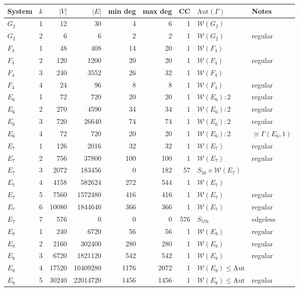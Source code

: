 \documentclass[11pt]{article}
\newcommand{\W}{\mathcal{W}}
\begin{document}
\begin{table}[h]
\centering
\begin{tabular}{llrrrrrll}
\toprule
System & $k$ & $|V|$ & $|E|$ & min deg & max deg & CC & $\mathrm{Aut}(\Gamma)$ & Notes \\
\midrule
$G_2$ & 1 & 12 & 30 & 4 & 6 & 1 & $\W(G_2)$ & \\
$G_2$ & 2 & 6 & 6 & 2 & 2 & 1 & $\W(G_2)$ & regular \\
\midrule
$F_4$ & 1 & 48 & 408 & 14 & 20 & 1 & $\W(F_4)$ & \\
$F_4$ & 2 & 120 & 1200 & 20 & 20 & 1 & $\W(F_4)$ & regular \\
$F_4$ & 3 & 240 & 3552 & 26 & 32 & 1 & $\W(F_4)$ & \\
$F_4$ & 4 & 24 & 96 & 8 & 8 & 1 & $\W(F_4)$ & regular \\
\midrule
$E_6$ & 1 & 72 & 720 & 20 & 20 & 1 & $\W(E_6){:}2$ & regular \\
$E_6$ & 2 & 270 & 4590 & 34 & 34 & 1 & $\W(E_6){:}2$ & regular \\
$E_6$ & 3 & 720 & 26640 & 74 & 74 & 1 & $\W(E_6){:}2$ & regular \\
$E_6$ & 4 & 72 & 720 & 20 & 20 & 1 & $\W(E_6){:}2$ & $\cong \Gamma(E_6, 1)$ \\
\midrule
$E_7$ & 1 & 126 & 2016 & 32 & 32 & 1 & $\W(E_7)$ & regular \\
$E_7$ & 2 & 756 & 37800 & 100 & 100 & 1 & $\W(E_7)$ & regular \\
$E_7$ & 3 & 2072 & 183456 & 0 & 182 & 57 & $S_{56} \times \W(E_7)$ & \\
$E_7$ & 4 & 4158 & 582624 & 272 & 544 & 1 & $\W(E_7)$ & \\
$E_7$ & 5 & 7560 & 1572480 & 416 & 416 & 1 & $\W(E_7)$ & regular \\
$E_7$ & 6 & 10080 & 1844640 & 366 & 366 & 1 & $\W(E_7)$ & regular \\
$E_7$ & 7 & 576 & 0 & 0 & 0 & 576 & $S_{576}$ & edgeless \\
\midrule
$E_8$ & 1 & 240 & 6720 & 56 & 56 & 1 & $\W(E_8)$ & regular \\
$E_8$ & 2 & 2160 & 302400 & 280 & 280 & 1 & $\W(E_8)$ & regular \\
$E_8$ & 3 & 6720 & 1821120 & 542 & 542 & 1 & $\W(E_8)$ & regular \\
$E_8$ & 4 & 17520 & 10409280 & 1176 & 2072 & 1 & $\W(E_8) \leq \mathrm{Aut}$ & \\
$E_8$ & 5 & 30240 & 22014720 & 1456 & 1456 & 1 & $\W(E_8) \leq \mathrm{Aut}$ & regular \\

\end{tabular}
\end{table}
\end{document}

